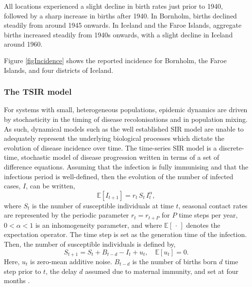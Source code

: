 \documentclass[10pt]{article}
\begin{document}
All locations experienced a slight decline in birth rates just prior to 1940, followed by a sharp increase in births after 1940. In Bornholm, births declined steadily from around 1945 onwards. In Iceland and the Faroe Islands, aggregate births increased steadily from 1940s onwards, with a slight decline in Iceland around 1960.

Figure \ref{figIncidence} shows the reported incidence for Bornholm, the Faroe Islands, and four districts of Iceland.










\subsubsection*{The TSIR model}

For systems with small, heterogeneous populations, epidemic dynamics are driven by stochasticity in the timing of disease recolonisations and in population mixing. As such, dynamical models such as the well established SIR model are unable to adequately represent the underlying biological processes which dictate the evolution of disease incidence over time. The time-series SIR model \cite{Finkenstadt2000} is a discrete-time, stochastic model of disease progression written in terms of a set of difference equations. Assuming that the infection is fully immunising and that the infectious period is well-defined, then the evolution of the number of infected cases, $I$, can be written,
\begin{equation}
\mathbb{E}\left[I_{t+1}\right] = r_t \, S_t \, I_t^\alpha,
\label{TSIR_I}
\end{equation}
where $S_t$ is the number of susceptible individuals at time $t$, seasonal contact rates are represented by the periodic parameter $r_t = r_{t+P}$ for $P$ time steps per year, $0 < \alpha < 1$ is an inhomogeneity parameter, and where $\mathbb{E}\left[\,\cdot\,\right]$ denotes the expectation operator. The time step is set as the generation time of the infection. Then, the number of susceptible individuals is defined by,
\begin{equation}
S_{t+1} = S_t + B_{t-d} - I_t + u_t, \quad \mathbb{E}\left[u_t\right] = 0.
\label{TSIR_S}
\end{equation}
Here, $u_t$ is  zero-mean additive noise. $B_{t-d}$ is the number of births born $d$ time step prior to $t$, the delay $d$ assumed due to maternal immunity, and set at four months \cite{Anderson1991}.
\end{document}
